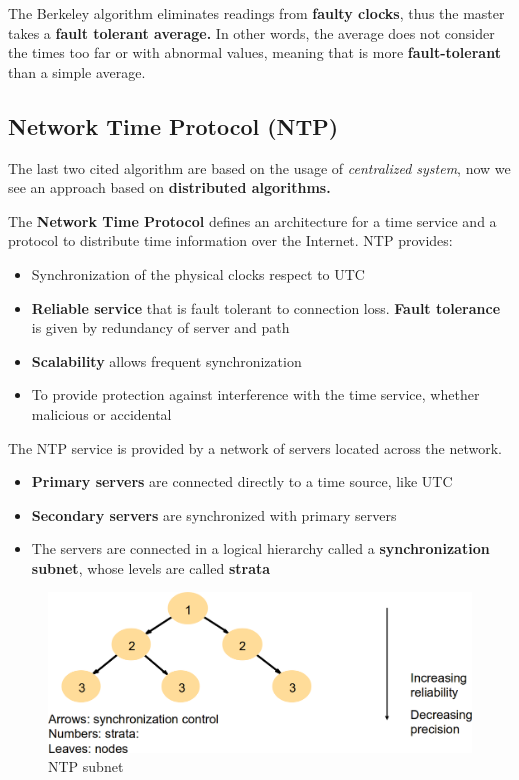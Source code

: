 The Berkeley algorithm eliminates readings from \textbf{faulty clocks}, thus the master takes a \textbf{fault tolerant average.} In other words, the average does not consider the times too far or with abnormal values, meaning that is more \textbf{fault-tolerant} than a simple average.

\subsection{Network Time Protocol (NTP)}
The last two cited algorithm are based on the usage of \textit{centralized system}, now we see an approach based on \textbf{distributed algorithms.}

The \textbf{Network Time Protocol} defines an architecture for a time service and a protocol to distribute time information over the Internet. NTP provides:
\begin{itemize}
    \item Synchronization of the physical clocks respect to UTC
    \item \textbf{Reliable service} that is fault tolerant to connection loss. \textbf{Fault tolerance} is given by redundancy of server and path
    \item \textbf{Scalability} allows frequent synchronization
    \item To provide protection against interference with the time service, whether malicious or accidental
\end{itemize}
The NTP service is provided by a network of servers located across the network.
\begin{itemize}
    \item \textbf{Primary servers} are connected directly to a time source, like UTC
    \item \textbf{Secondary servers} are synchronized with primary servers
    \item The servers are connected in a logical hierarchy called a \textbf{synchronization subnet}, whose levels are called \textbf{strata}
\end{itemize}

\begin{figure}[!h]
    \centering
    \includegraphics[width=.60\linewidth]{images/Clock/NTP.png}
    \caption{NTP subnet}
\end{figure}

